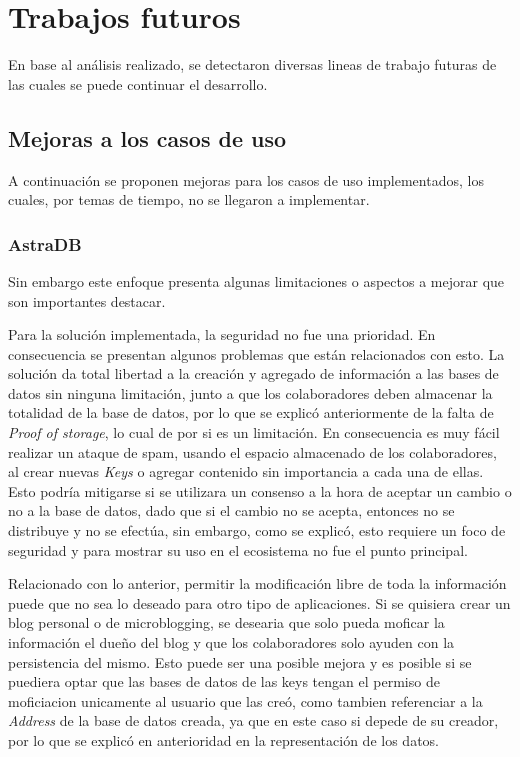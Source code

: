 \section{Trabajos futuros}

En base al análisis realizado, se detectaron diversas lineas de trabajo futuras de las cuales se puede continuar el desarrollo.

\subsection{Mejoras a los casos de uso}

A continuación se proponen mejoras para los casos de uso implementados, los cuales, por temas de tiempo, no se llegaron a implementar.

\subsubsection{AstraDB}

Sin embargo este enfoque presenta algunas limitaciones o aspectos a mejorar que son importantes destacar.

Para la solución implementada, la seguridad no fue una prioridad. En consecuencia se presentan algunos problemas que están relacionados con esto. La solución da total libertad a la creación y agregado de información a las bases de datos sin ninguna limitación, junto a que los colaboradores deben almacenar la totalidad de la base de datos, por lo que se explicó anteriormente de la falta de \textit{Proof of storage}, lo cual de por si es un limitación. En consecuencia es muy fácil realizar un ataque de spam, usando el espacio almacenado de los colaboradores, al crear nuevas \textit{Keys} o agregar contenido sin importancia a cada una de ellas. Esto podría mitigarse si se utilizara un consenso a la hora de aceptar un cambio o no a la base de datos, dado que si el cambio no se acepta, entonces no se distribuye y no se efectúa, sin embargo, como se explicó, esto requiere un foco de seguridad y para mostrar su uso en el ecosistema no fue el punto principal.

Relacionado con lo anterior, permitir la modificación libre de toda la información puede que no sea lo deseado para otro tipo de aplicaciones. Si se quisiera crear un blog personal o de microblogging, se desearia que solo  pueda moficar la información el dueño del blog y que los colaboradores solo ayuden con la persistencia del mismo. Esto puede ser una posible mejora y es posible si se puediera optar que las bases de datos de las keys tengan el permiso de moficiacion unicamente al usuario que las creó, como tambien referenciar a la \textit{Address} de la base de datos creada, ya que en este caso si depede de su creador, por lo que se explicó en anterioridad en la representación de los datos.


